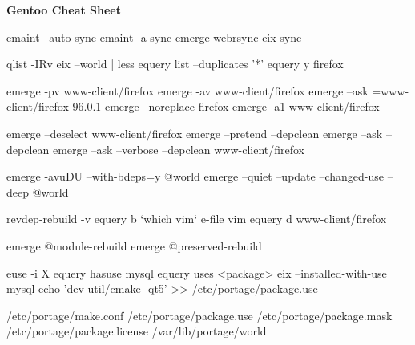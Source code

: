 \documentclass[10pt]{article}
\begin{document}
\pagestyle{empty}
\begin{center}
    {\Huge\textbf{Gentoo Cheat Sheet}}
\end{center}

\begin{multicols}{2}

\begin{cheatbox}{}
emaint --auto sync
emaint -a sync
emerge-webrsync
eix-sync
\end{cheatbox}

\begin{cheatbox}{}
qlist -IRv
eix --world | less
equery list --duplicates '*'
equery y firefox
\end{cheatbox}

\begin{cheatbox}{}
emerge -pv www-client/firefox
emerge -av www-client/firefox
emerge --ask =www-client/firefox-96.0.1
emerge --noreplace firefox
emerge -a1 www-client/firefox
\end{cheatbox}

\begin{cheatbox}{}
emerge --deselect www-client/firefox
emerge --pretend --depclean
emerge --ask --depclean
emerge --ask --verbose --depclean www-client/firefox
\end{cheatbox}

\begin{cheatbox}{}
emerge -avuDU --with-bdeps=y @world
emerge --quiet --update --changed-use --deep @world
\end{cheatbox}

\begin{cheatbox}[Troubleshooting]{}
revdep-rebuild -v
equery b `which vim`
e-file vim
equery d www-client/firefox
\end{cheatbox}

\begin{cheatbox}[Rebuilds]{}
emerge @module-rebuild
emerge @preserved-rebuild
\end{cheatbox}

\begin{cheatbox}{}
euse -i X
equery hasuse mysql
equery uses <package>
eix --installed-with-use mysql
echo 'dev-util/cmake -qt5' >> /etc/portage/package.use
\end{cheatbox}

\begin{cheatbox}{}
/etc/portage/make.conf
/etc/portage/package.use
/etc/portage/package.mask
/etc/portage/package.license
/var/lib/portage/world
\end{cheatbox}


\end{multicols}
\end{document}
